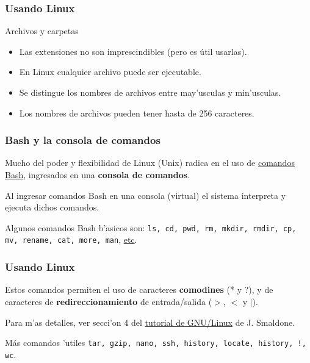 \documentclass[hyperref={colorlinks}]{beamer}
\begin{document}
\begin{frame}\frametitle{Usando Linux}
\begin{block}{Archivos y carpetas}
\begin{itemize}
\item Las extensiones no son imprescindibles (pero es útil usarlas).
\item En Linux cualquier archivo puede ser ejecutable.
\item Se distingue los nombres de archivos entre may'usculas y min'usculas.
\item Los nombres de archivos pueden tener hasta de 256 caracteres.
\end{itemize}
\end{block}
\end{frame}


\begin{frame}\frametitle{Bash y la consola de comandos}
\begin{block}{}
Mucho del poder y flexibilidad de Linux (Unix) radica en el uso de \href{https://es.wikipedia.org/wiki/Comandos_Bash}{comandos Bash}, ingresados en una \textbf{consola de comandos}.

Al ingresar comandos Bash en una consola (virtual) el sistema interpreta y ejecuta dichos comandos.
\end{block}
\begin{block}{}
Algunos comandos Bash b'asicos son: \texttt{ls, cd, pwd, rm, mkdir, rmdir, cp, mv, rename, cat, more, man}, \href{https://es.wikipedia.org/wiki/Comandos_Bash}{etc}.
\end{block}
\end{frame}

\begin{frame}\frametitle{Usando Linux}
\begin{block}{}
Estos comandos permiten el uso de caracteres \textbf{comodines} (* y ?), y de caracteres de \textbf{redireccionamiento} de entrada/salida ($>$, $<$ y $|$).
\end{block}

\begin{block}{}
Para m'as detalles, ver secci'on 4 del \href{http://www.smaldone.com.ar/documentos/misdocumentos.shtml}{tutorial de GNU/Linux} de J. Smaldone.
\end{block}

\begin{block}{M\'as comandos 'utiles}
\texttt{tar, gzip, nano, ssh, history, locate, history, !, wc}.
\end{block}
\end{frame}
\end{document}
